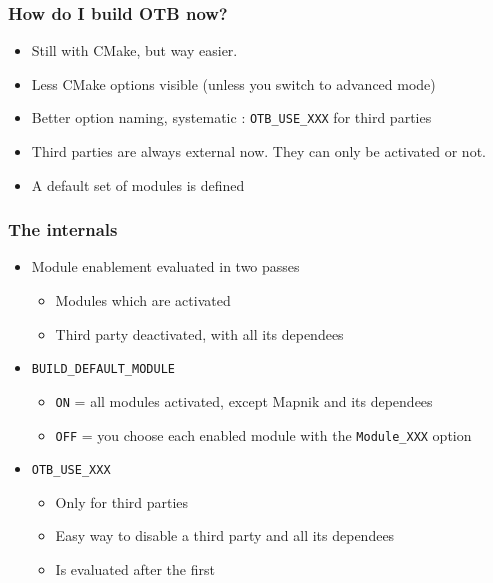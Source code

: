 \documentclass[8pt]{beamer}
\begin{document}
\begin{frame}
\frametitle{How do I build OTB now?}
\begin{itemize}
\item Still with CMake, but way easier.
\item Less CMake options visible (unless you switch to advanced mode)
\item Better option naming, systematic : \texttt{OTB\_USE\_XXX} for third parties
\item Third parties are always external now. They can only be activated or not.
\item A default set of modules is defined
\end{itemize}
\end{frame}

\begin{frame}
\frametitle{The internals}

\begin{itemize}
\item Module enablement evaluated in two passes
\begin{itemize}
\item Modules which are activated
\item Third party deactivated, with all its dependees 
\end{itemize}
\end{itemize}


\begin{itemize}
\item \texttt{BUILD\_DEFAULT\_MODULE}
\begin{itemize}
\item \texttt{ON} = all modules activated, except Mapnik and its dependees
\item \texttt{OFF} = you choose each enabled module with the \texttt{Module\_XXX} option
\end{itemize}

\item \texttt{OTB\_USE\_XXX}
\begin{itemize}
\item Only for third parties
\item Easy way to disable a third party and all its dependees
\item Is evaluated after the first
\end{itemize}

\end{itemize}
\end{frame}
\end{document}

